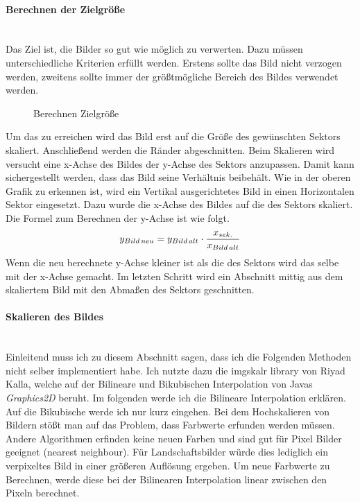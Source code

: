 \newpage

\paragraph{Berechnen der Zielgröße}\mbox{}\\
Das Ziel ist, die Bilder so gut wie möglich zu verwerten. Dazu müssen unterschiedliche Kriterien erfüllt werden. Erstens sollte das Bild nicht verzogen werden, zweitens sollte immer der größtmögliche Bereich des Bildes verwendet werden.

\begin{figure}[h]
    \centering
    \fontsize{12pt}{12pt}\selectfont%
    \def\svgwidth{12cm}
    
    \caption[Berechnen Zielgröße]{Berechnen Zielgröße}
\end{figure}

Um das zu erreichen wird das Bild erst auf die Größe des gewünschten Sektors skaliert. Anschließend werden die Ränder abgeschnitten. Beim Skalieren wird versucht eine x-Achse des Bildes der y-Achse des Sektors anzupassen. Damit kann sichergestellt werden, dass das Bild seine Verhältnis beibehält. Wie in der oberen Grafik zu erkennen ist, wird ein Vertikal ausgerichtetes Bild in einen Horizontalen Sektor eingesetzt. Dazu wurde die x-Achse des Bildes auf die des Sektors skaliert. Die Formel zum Berechnen der y-Achse ist wie folgt.
\begin{align}
    y_\mathnormal{Bild\,neu}=y_\mathnormal{Bild\,alt} \cdot \frac{x_\mathnormal{sek.}}{x_\mathnormal{Bild\,alt}}
\end{align}    
Wenn die neu berechnete y-Achse kleiner ist als die des Sektors wird das selbe mit der x-Achse gemacht. Im letzten Schritt wird ein Abschnitt mittig aus dem skaliertem Bild mit den Abmaßen des Sektors geschnitten.

\newpage

\paragraph{Skalieren des Bildes}\mbox{}\\
Einleitend muss ich zu diesem Abschnitt sagen, dass ich die Folgenden Methoden nicht selber implementiert habe. Ich nutzte dazu die imgskalr library von Riyad Kalla, welche auf der Bilineare und Bikubischen Interpolation von Javas \textit{Graphics2D} beruht.\cite{Scalr:Kalla} Im folgenden werde ich die Bilineare Interpolation erklären. Auf die Bikubische werde ich nur kurz eingehen.
\medskip
\newline
Bei dem Hochskalieren von Bildern stößt man auf das Problem, dass Farbwerte erfunden werden müssen. Andere Algorithmen erfinden keine neuen Farben und sind gut für Pixel Bilder geeignet (nearest neighbour). Für Landschaftsbilder würde dies lediglich ein verpixeltes Bild in einer größeren Auflösung ergeben. Um neue Farbwerte zu Berechnen, werde diese bei der Bilinearen Interpolation linear zwischen den Pixeln berechnet.

